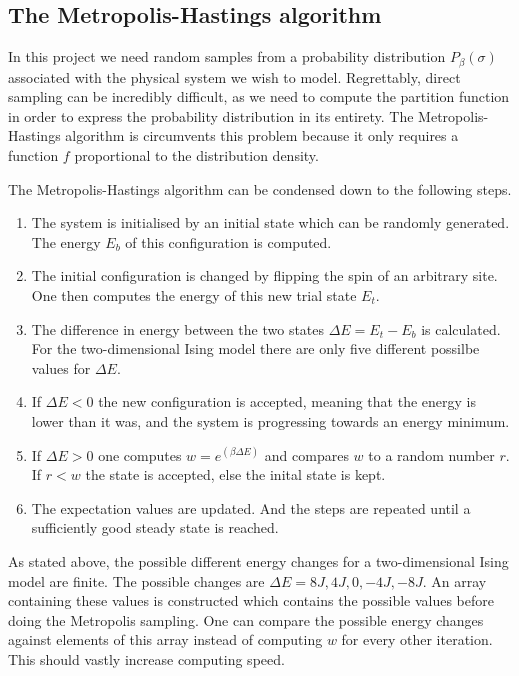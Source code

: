 \documentclass[10pt,a4paper]{amsart}
\begin{document}
\subsection{The Metropolis-Hastings algorithm}
In this project we need random samples from a probability distribution $P_\beta (\sigma)$ associated with the physical system we wish to model. Regrettably, direct sampling can be incredibly difficult, as we need to compute the partition function in order to express the probability distribution in its entirety. The Metropolis-Hastings algorithm is circumvents this problem because it only requires a function $f$ proportional to the distribution density.

The Metropolis-Hastings algorithm can be condensed down to the following steps.
\begin{enumerate}
\item The system is initialised by an initial state which can be randomly generated. The energy $E_b$ of this configuration is computed.
\item The initial configuration is changed by flipping the spin of an arbitrary site. One then computes the energy of this new trial state $E_t$.
\item The difference in energy between the two states $\Delta E = E_t - E_b$ is calculated. For the two-dimensional Ising model there are only five different possilbe values for $\Delta E$.
\item If $ \Delta E < 0$ the new configuration is accepted, meaning that the energy is lower than it was, and the system is progressing towards an energy minimum.
\item If $ \Delta E > 0$ one computes $w = e^(\beta \Delta E)$ and compares $w$ to a random number $r$. If $r < w$ the state is accepted, else the inital state is kept.
\item The expectation values are updated. And the steps are repeated until a sufficiently good steady state is reached.
\end{enumerate}

As stated above, the possible different energy changes for a two-dimensional Ising model are finite. The possible changes are $\Delta E = 8J, 4J, 0, -4J, -8J$.  An array containing these values is constructed which contains the possible values before doing the Metropolis sampling. One can compare the possible energy changes against elements of this array instead of computing $w$ for every other iteration. This should vastly increase computing speed.
\end{document}

